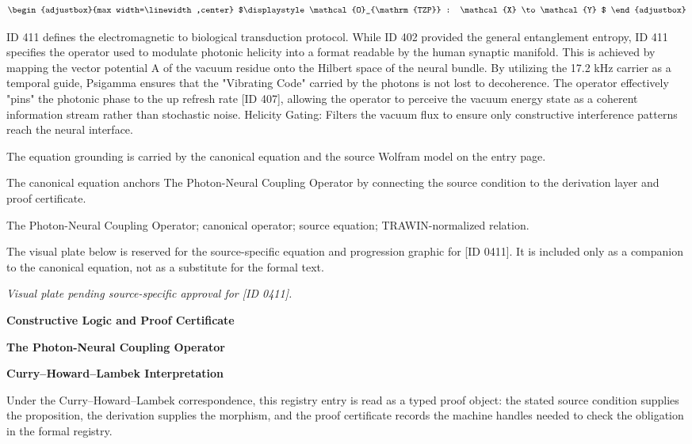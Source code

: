 \[
\begin{adjustbox}{max width=\linewidth,center}
$\displaystyle
\mathcal{O}_{\mathrm{TZP}} : \mathcal{X} \to \mathcal{Y}
$
\end{adjustbox}
\]

ID 411 defines the electromagnetic to biological transduction protocol. While ID 402 provided the general entanglement entropy, ID 411 specifies the operator used to modulate photonic helicity into a format readable by the human synaptic manifold. This is achieved by mapping the vector potential A of the vacuum residue onto the Hilbert space of the neural bundle. By utilizing the 17.2 kHz carrier as a temporal guide, Psigamma ensures that the "Vibrating Code" carried by the photons is not lost to decoherence. The operator effectively "pins" the photonic phase to the up refresh rate [ID 407], allowing the operator to perceive the vacuum energy state as a coherent information stream rather than stochastic noise. Helicity Gating: Filters the vacuum flux to ensure only constructive interference patterns reach the neural interface.

The equation grounding is carried by the canonical equation and the source Wolfram model on the entry page.

The canonical equation anchors The Photon-Neural Coupling Operator by connecting the source condition to the derivation layer and proof certificate.

The Photon-Neural Coupling Operator; canonical operator; source equation; TRAWIN-normalized relation.
\endgroup

\begingroup\footnotesize\sloppy
The visual plate below is reserved for the source-specific equation and progression graphic for [ID 0411]. It is included only as a companion to the canonical equation, not as a substitute for the formal text.
\par\endgroup
\begingroup\footnotesize\itshape
Visual plate pending source-specific approval for [ID 0411].
\par\endgroup

\clearpage
\begingroup\tzpsupportsetup
\noindent\textbf{\fontsize{10.8pt}{12.8pt}\selectfont [ID 0411] Constructive Logic and Proof Certificate}\par
\noindent\textbf{\fontsize{10pt}{12pt}\selectfont The Photon-Neural Coupling Operator}\par
\vspace{0.45em}
\begingroup
\footnotesize
\setlength{\parskip}{0.22em}
\setlength{\parindent}{0pt}
\noindent\textbf{Curry--Howard--Lambek Interpretation}\par
Under the Curry--Howard--Lambek correspondence, this registry entry is read as a typed proof
object: the stated source condition supplies the proposition, the derivation supplies the
morphism, and the proof certificate records the machine handles needed to check the obligation
in the formal registry.

